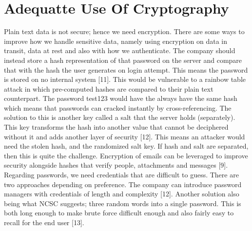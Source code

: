\section {Adequatte Use Of Cryptography}
Plain text data is not secure; hence we need encryption. There are some ways to improve how we handle sensitive data, namely using encryption on data in transit, data at rest and also with how we authenticate. The company should instead store a hash representation of that password on the server and compare that with the hash the user generates on login attempt. This means the password is stored on no internal system [11].
This would be vulnerable to a rainbow table attack in which pre-computed hashes are compared to their plain text counterpart. The password test123 would have the always have the same hash which means that passwords can cracked instantly by cross-referencing. The solution to this is another key called a salt that the server holds (separately). This key transforms the hash into another value that cannot be deciphered without it and adds another layer of security [12]. This means an attacker would need the stolen hash, and the randomized salt key. If hash and salt are separated, then this is quite the challenge.
Encryption of emails can be leveraged to improve security alongside hashes that verify people, attachments and messages [9].
Regarding passwords, we need credentials that are difficult to guess. There are two approaches depending on preference. The company can introduce password managers with credentials of length and complexity [12]. Another solution also being what NCSC suggests; three random words into a single password. This is both long enough to make brute force difficult enough and also fairly easy to recall for the end user [13].

